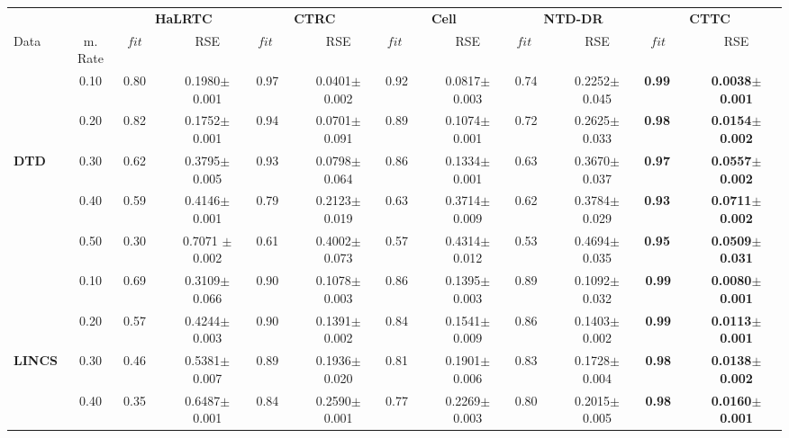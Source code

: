 \documentclass{article}
\begin{document}
\begin{table}
\renewcommand{\arraystretch}{1.1}
\renewcommand{\arraystretch}{1.1}
\centering
\resizebox{1\textwidth}{!}
{
\begin{tabular}{l ||c ||c c|| c c|| c c|| c c ||c c}
\hline
&& \multicolumn{2}{c}{\textbf{HaLRTC}} & \multicolumn{2}{c}{\textbf{CTRC}} & \multicolumn{2}{c}{\textbf{Cell}}  &
\multicolumn{2}{c}{\textbf{NTD-DR}}  &
\multicolumn{2}{c}{\textbf{CTTC} }
\\
Data & m. Rate 
&  $fit$~~ & RSE 
& $fit$ ~~& RSE 
& $fit$ ~~& RSE 
& $fit$ ~~& RSE 
& $fit$~~ & RSE \\
\hline
\hline
& 0.10
&0.80~~
&0.1980$\pm$ 0.001
& {0.97}~~
& {0.0401$\pm$0.002}
&0.92~~
&0.0817$\pm$ 0.003
&0.74~~
&0.2252$\pm$0.045
&\textbf{0.99~~}
&\textbf{0.0038$\pm$ 0.001}
\\
&0.20
&0.82~~
&0.1752$\pm$ 0.001
& {0.94}~~
& {0.0701$\pm$ 0.091}
& 0.89~~
& 0.1074$\pm$ 0.001
& 0.72~~
&0.2625$\pm$ 0.033
&\textbf{0.98~~}
&\textbf{0.0154$\pm$ 0.002}
\\
\textbf{DTD}
& 0.30
&0.62~~
&0.3795$\pm$ 0.005
& {0.93}~~
& {0.0798$\pm$ 0.064}
&0.86~~
&0.1334$\pm$0.001
&0.63~~
&0.3670$\pm$0.037
&\textbf{0.97~~}
&\textbf{0.0557$\pm$ 0.002}
\\
& 0.40 
&0.59~~
&0.4146$\pm$ 0.001
& {0.79}~~
& {0.2123$\pm$ 0.019}
&0.63~~
&0.3714$\pm$ 0.009
&0.62~~
&0.3784$\pm$0.029
&\textbf{0.93~~}
&\textbf{ 0.0711$\pm$ 0.002}
\\
& 0.50
&0.30~~
&0.7071 $\pm$ 0.002
& {0.61}~~
& {0.4002$\pm$ 0.073} 
&0.57~~
&0.4314$\pm$ 0.012
&0.53~~
&0.4694$\pm$0.035
& \textbf{0.95~~}
&\textbf{0.0509$\pm$ 0.031}
\\
\hline
\hline
\hline
& 0.10
&0.69~~
&0.3109$\pm$0.066
& {0.90}~~
& {0.1078$\pm$ 0.003}  
&0.86~~
&0.1395$\pm$0.003
&0.89~~
& 0.1092$\pm$ 0.032
&\textbf{0.99}~~
&\textbf{{0.0080$\pm$0.001}}
\\
& 0.20
&0.57~~
&0.4244$\pm$0.003
& 0.90~~
&   {0.1391$\pm$ 0.002} 
&0.84~~
&0.1541$\pm$0.009
&0.86~~
& 0.1403$\pm$ 0.002
&\textbf{0.99}~~
& \textbf{{0.0113$\pm$0.001}}
\\
\textbf{LINCS}
& 0.30
&0.46~~
&0.5381$\pm$0.007
& 0.89~~
& 0.1936$\pm$ 0.020
&0.81~~
&0.1901$\pm$0.006
&0.83~~
& 0.1728$\pm$ 0.004
&\textbf{0.98}~~
&\textbf{{0.0138$\pm$0.002}}
\\
& 0.40
&0.35~~
&0.6487$\pm$0.001
& 0.84~~
& 0.2590$\pm$0.001
&0.77~~
&0.2269$\pm$0.003
&0.80~~
& 0.2015$\pm$ 0.005
&\textbf{0.98}~~
&\textbf{{0.0160$\pm$0.001}}
\\

\end{tabular}}
\end{table}
\end{document}
